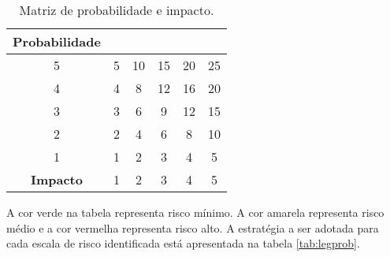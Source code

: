  	\begin{table}[H]
\centering
\caption{Matriz de probabilidade e impacto.}
\label{tab:matriz_probabilidade_impacto}
\begin{tabular}{|c|ccccc}
\cline{1-1}
\textbf{Probabilidade} &                                                &                                                 &                                                 &                                                 &                                                 \\ \hline
5             & \multicolumn{1}{c|}{\cellcolor[HTML]{34FF34}5} & \multicolumn{1}{c|}{\cellcolor[HTML]{F8FF00}10} & \multicolumn{1}{c|}{\cellcolor[HTML]{FE0000}15} & \multicolumn{1}{c|}{\cellcolor[HTML]{FE0000}20} & \multicolumn{1}{c|}{\cellcolor[HTML]{FE0000}25} \\ \hline
4             & \multicolumn{1}{c|}{\cellcolor[HTML]{34FF34}4} & \multicolumn{1}{c|}{\cellcolor[HTML]{F8FF00}8}  & \multicolumn{1}{c|}{\cellcolor[HTML]{F8FF00}12} & \multicolumn{1}{c|}{\cellcolor[HTML]{FE0000}16} & \multicolumn{1}{c|}{\cellcolor[HTML]{FE0000}20} \\ \hline
3             & \multicolumn{1}{c|}{\cellcolor[HTML]{34FF34}3} & \multicolumn{1}{c|}{\cellcolor[HTML]{F8FF00}6}  & \multicolumn{1}{c|}{\cellcolor[HTML]{F8FF00}9}  & \multicolumn{1}{c|}{\cellcolor[HTML]{F8FF00}12} & \multicolumn{1}{c|}{\cellcolor[HTML]{FE0000}15} \\ \hline
2             & \multicolumn{1}{c|}{\cellcolor[HTML]{34FF34}2} & \multicolumn{1}{c|}{\cellcolor[HTML]{34FF34}4}  & \multicolumn{1}{c|}{\cellcolor[HTML]{F8FF00}6}  & \multicolumn{1}{c|}{\cellcolor[HTML]{F8FF00}8}  & \multicolumn{1}{c|}{\cellcolor[HTML]{F8FF00}10} \\ \hline
1             & \multicolumn{1}{c|}{\cellcolor[HTML]{34FF34}1} & \multicolumn{1}{c|}{\cellcolor[HTML]{34FF34}2}  & \multicolumn{1}{c|}{\cellcolor[HTML]{34FF34}3}  & \multicolumn{1}{c|}{\cellcolor[HTML]{34FF34}4}  & \multicolumn{1}{c|}{\cellcolor[HTML]{34FF34}5}  \\ \hline
\textbf{Impacto}       & \multicolumn{1}{c|}{1}                         & \multicolumn{1}{c|}{2}                          & \multicolumn{1}{c|}{3}                          & \multicolumn{1}{c|}{4}                          & \multicolumn{1}{c|}{5}                          \\ \hline
\end{tabular}
\end{table}

	A cor verde na tabela representa risco mínimo. A cor amarela representa risco médio e a cor vermelha representa risco alto. A estratégia a ser adotada para cada escala de risco identificada está apresentada na tabela \ref{tab:legprob}. 

